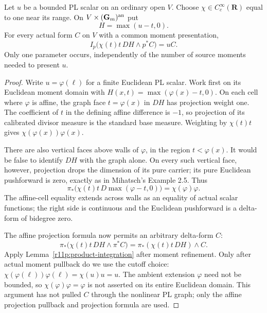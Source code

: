 \begin{lemma}
\label{r11p:one-parameter}
Let $u$ be a bounded PL scalar on an ordinary open $V$.  Choose
$\chi\in C_c^\infty(\mathbf R)$ equal to one near its range.  On
$V\times(\mathbf G_m)^{\rm an}$ put
\[
                         H=\max(u-t,0).
\]
For every actual form $C$ on $V$ with a common moment presentation,
\[
                  I_p\bigl(\chi(t)t\,DH\wedge p^*C\bigr)=uC.
\tag{MT8}\label{r11p:graph-evaluation}
\]
Only one parameter occurs, independently of the number of source
moments needed to present $u$.
\end{lemma}

\begin{proof}
Write $u=\varphi(\ell)$ for a finite Euclidean PL scalar.  Work first
on its Euclidean moment domain with $H(x,t)=\max(\varphi(x)-t,0)$.
On each cell where $\varphi$ is affine, the graph face $t=\varphi(x)$
in $DH$ has projection weight one.  The coefficient of $t$ in the
defining affine difference is $-1$, so projection of its calibrated
divisor measure is the standard base measure.  Weighting by $\chi(t)t$
gives $\chi(\varphi(x))\varphi(x)$.

There are also vertical faces above walls of $\varphi$, in the region
$t<\varphi(x)$.  It would be false to identify $DH$ with the graph
alone.  On every such vertical face, however, projection drops the
dimension of its pure carrier; its pure Euclidean pushforward is
zero, exactly as in Mihatsch's Example 2.5.  Thus
\[
               \pi_*\bigl(\chi(t)t\,D\max(\varphi-t,0)\bigr)
                                  =\chi(\varphi)\varphi.
\]
The affine-cell equality extends across walls as an equality of
actual scalar functions; the right side is continuous and the
Euclidean pushforward is a delta-form of bidegree zero.

The affine projection formula now permits an arbitrary delta-form
$C$:
\[
 \pi_*\bigl(\chi(t)t\,DH\wedge\pi^*C\bigr)
       =\pi_*(\chi(t)t\,DH)\wedge C.
\]
Apply Lemma~\ref{r11p:product-integration} after moment refinement.
Only after actual moment pullback do we use the cutoff choice:
$\chi(\varphi(\ell))\varphi(\ell)=\chi(u)u=u$.
The ambient extension $\varphi$ need not be bounded, so
$\chi(\varphi)\varphi=\varphi$ is not asserted on its entire
Euclidean domain.
This argument has not pulled $C$ through the nonlinear PL graph;
only the affine projection pullback and projection formula are used.
\end{proof}

